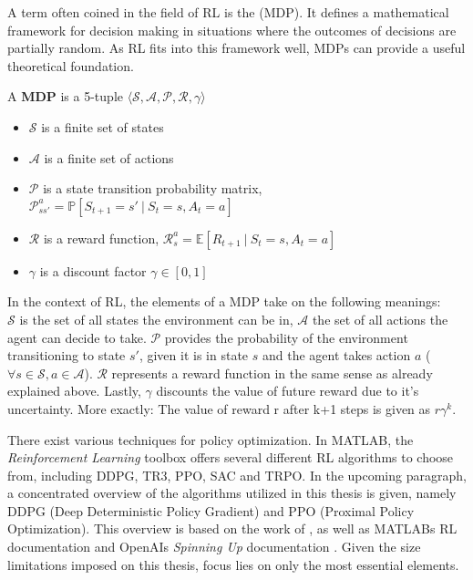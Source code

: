 A term often coined in the field of RL is the  (MDP).
It defines a mathematical framework for decision making in situations where the outcomes of decisions are partially random.
As RL fits into this framework well, MDPs can provide a useful theoretical foundation.\\

\begin{definition}
	A \textbf{MDP} is a 5-tuple $\langle \mathcal{S,A,P,R,\gamma} \rangle$
	\begin{itemize}
		\item $\mathcal{S}$ is a finite set of states
		\item $\mathcal{A}$ is a finite set of actions
		\item $\mathcal{P}$ is a state transition probability matrix, $\mathcal{P}_{ss'}^a = \mathbb{P}[S_{t+1} = s' \ | \ S_t = s, A_t = a	] $
		\item $\mathcal{R}$ is a reward function, $\mathcal{R}_s^a = \mathbb{E}[R_{t+1} \ | \ S_t = s, A_t = a]$
		\item $\mathcal{\gamma}$ is a discount factor $\mathcal{\gamma} \in [0,1]$
	\end{itemize}
\end{definition}

In the context of RL, the elements of a MDP take on the following meanings:\\
$\mathcal{S}$ is the set of all states the environment can be in, $\mathcal{A}$ the set of all actions the agent can decide to take.
$\mathcal{P}$ provides the probability of the environment transitioning to state $s'$, given it is in state $s$ and the agent takes action $a$ ($\forall s \in \mathcal{S}, a \in \mathcal{A}$).
$\mathcal{R}$ represents a reward function in the same sense as already explained above.
Lastly, $\mathcal{\gamma}$ discounts the value of future reward due to it's uncertainty.
More exactly: The value of  reward r after k+1 steps is given as $r\mathcal{\gamma}^k$.

There exist various techniques for policy optimization.
In MATLAB, the \emph{Reinforcement Learning} toolbox offers several different RL algorithms to choose from, including DDPG, TR3, PPO, SAC and TRPO.
In the upcoming paragraph, a concentrated overview of the algorithms utilized in this thesis is given, namely DDPG (Deep Deterministic Policy Gradient) and PPO (Proximal Policy Optimization).
This overview is based on the work of \cite{silver2015}, as well as MATLABs RL documentation and OpenAIs \textit{Spinning Up} documentation \parencite{matlabRLDocumentation, openAI_SpinningUp_Documentation}.
Given the size limitations imposed on this thesis, focus lies on only the most essential elements.


